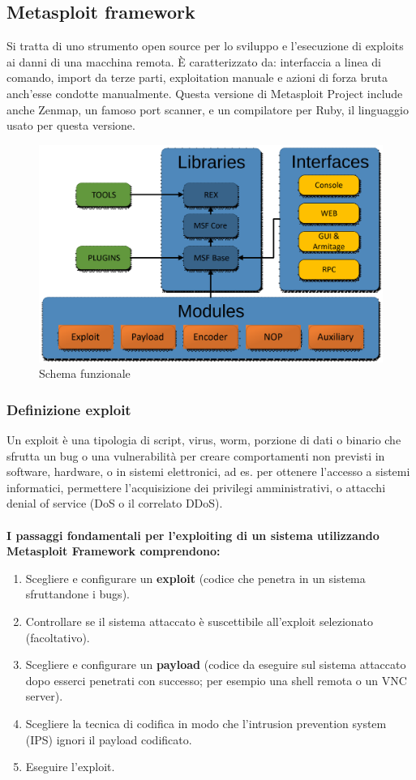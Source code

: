 \documentclass[8pt]{extarticle}
\begin{document}
\subsection{Metasploit framework}
Si tratta di uno strumento open source per lo sviluppo e l'esecuzione di exploits ai danni di una macchina 
remota. È caratterizzato da: interfaccia a linea di comando, import da terze parti, exploitation manuale e 
azioni di forza bruta anch’esse condotte manualmente. Questa versione di Metasploit Project include anche 
Zenmap, un famoso port scanner, e un compilatore per Ruby, il linguaggio usato per questa versione. 
\begin{figure}[H]
    \center
    \includegraphics[scale=0.2]{images/SchemaMetasploit.png}
    \caption{Schema funzionale}\label{fig:1}
\end{figure}
\subsubsection{Definizione exploit}
Un exploit è una tipologia di script, virus, worm, porzione di dati o binario che sfrutta un bug 
o una vulnerabilità per creare comportamenti non previsti in software, hardware, o in sistemi elettronici, 
ad es. per ottenere l'accesso a sistemi informatici, permettere l'acquisizione dei privilegi amministrativi, 
o attacchi denial of service (DoS o il correlato DDoS). \\\\
\textbf{I passaggi fondamentali per l'exploiting di un sistema utilizzando Metasploit Framework comprendono:}
\begin{enumerate}
    \item Scegliere e configurare un \textbf{exploit} (codice che penetra in un sistema sfruttandone i bugs). 
    \item Controllare se il sistema attaccato è suscettibile all’exploit selezionato (facoltativo).
    \item Scegliere e configurare un \textbf{payload} (codice da eseguire sul sistema attaccato dopo esserci 
    penetrati con successo; per esempio una shell remota o un VNC server).
    \item Scegliere la tecnica di codifica in modo che l’intrusion prevention system (IPS) ignori il payload 
    codificato. 
    \item Eseguire l’exploit.
\end{enumerate}
\end{document}
